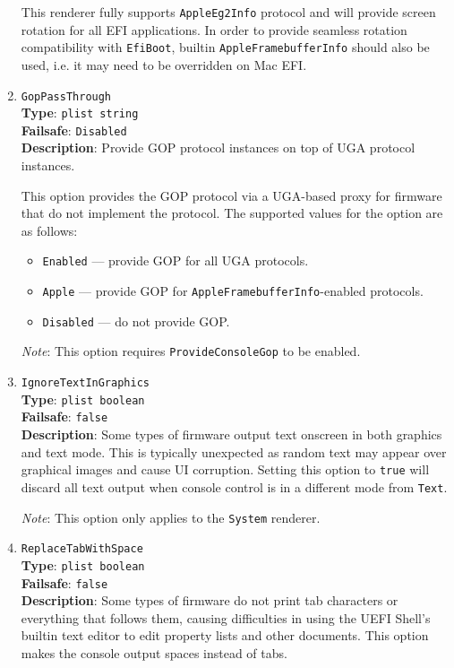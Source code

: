 \documentclass[]{article}
\providecommand{\tightlist}{%
  \setlength{\itemsep}{0pt}\setlength{\parskip}{0pt}}
\begin{document}
\begin{enumerate}
  This renderer fully supports \texttt{AppleEg2Info} protocol and will provide
  screen rotation for all EFI applications. In order to provide seamless rotation
  compatibility with \texttt{EfiBoot}, builtin \texttt{AppleFramebufferInfo} should
  also be used, i.e. it may need to be overridden on Mac EFI.

\item
  \texttt{GopPassThrough}\\
  \textbf{Type}: \texttt{plist\ string}\\
  \textbf{Failsafe}: \texttt{Disabled}\\
  \textbf{Description}: Provide GOP protocol instances on top of UGA protocol instances.

  This option provides the GOP protocol via a UGA-based proxy
  for firmware that do not implement the protocol. The supported values
  for the option are as follows:

  \begin{itemize}
    \tightlist
    \item \texttt{Enabled} --- provide GOP for all UGA protocols.
    \item \texttt{Apple} --- provide GOP for \texttt{AppleFramebufferInfo}-enabled protocols.
    \item \texttt{Disabled} --- do not provide GOP.
  \end{itemize}

  \emph{Note}: This option requires \texttt{ProvideConsoleGop} to be enabled.

\item
  \texttt{IgnoreTextInGraphics}\\
  \textbf{Type}: \texttt{plist\ boolean}\\
  \textbf{Failsafe}: \texttt{false}\\
  \textbf{Description}: Some types of firmware output text onscreen in both graphics and
  text mode. This is typically unexpected as random text may appear over
  graphical images and cause UI corruption. Setting this option to \texttt{true} will
  discard all text output when console control is in a different mode from \texttt{Text}.

  \emph{Note}: This option only applies to the \texttt{System} renderer.

\item
  \texttt{ReplaceTabWithSpace}\\
  \textbf{Type}: \texttt{plist\ boolean}\\
  \textbf{Failsafe}: \texttt{false}\\
  \textbf{Description}: Some types of firmware do not print tab characters or everything
  that follows them, causing difficulties in using the UEFI Shell's builtin
  text editor to edit property lists and other documents. This option makes the console
  output spaces instead of tabs.


\end{enumerate}
\end{document}
